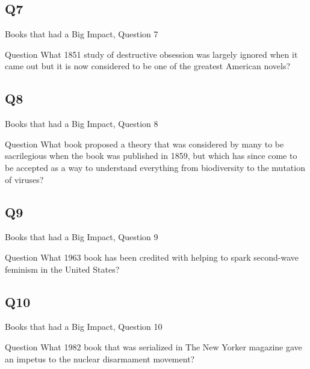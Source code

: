 \documentclass[11pt]{beamer}
\begin{document}
\subsection*{Q7}
\begin{frame}[t]{Books that had a Big Impact, Question 7}
\begin{block}{Question}
What 1851 study of destructive obsession was largely ignored when it came out but it is now considered to be one of the greatest American novels?
\end{block}
\end{frame}
\subsection*{Q8}
\begin{frame}[t]{Books that had a Big Impact, Question 8}
\begin{block}{Question}
What book proposed a theory that was considered by many to be sacrilegious when the book was published in 1859, but which has since come to be accepted as a way to understand everything from biodiversity to the mutation of viruses?
\end{block}
\end{frame}
\subsection*{Q9}
\begin{frame}[t]{Books that had a Big Impact, Question 9}
\begin{block}{Question}
What 1963 book has been credited with helping to spark second-wave feminism in the United States?
\end{block}
\end{frame}
\subsection*{Q10}
\begin{frame}[t]{Books that had a Big Impact, Question 10}
\begin{block}{Question}
What 1982 book that was serialized in The New Yorker magazine gave an impetus to the nuclear disarmament movement?
\end{block}
\end{frame}
\end{document}
